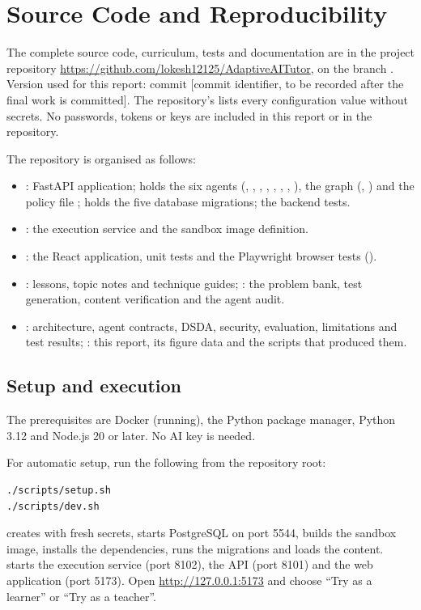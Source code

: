 \chapter{Source Code and Reproducibility}\label{app:repro}
The complete source code, curriculum, tests and documentation are in the project repository \url{https://github.com/lokesh12125/AdaptiveAITutor}, on the branch . Version used for this report: commit [commit identifier, to be recorded after the final work is committed]. The repository's  lists every configuration value without secrets. No passwords, tokens or keys are included in this report or in the repository.

The repository is organised as follows:
{\sloppy
\begin{itemize}
\item {}: FastAPI application;  holds the six agents (, , , , , , , ), the graph (, ) and the policy file ;  holds the five database migrations;  the backend tests.
\item {}: the execution service and the sandbox image definition.
\item {}: the React application, unit tests and the Playwright browser tests ().
\item {}: lessons, topic notes and technique guides; : the problem bank, test generation, content verification and the agent audit.
\item {}: architecture, agent contracts, DSDA, security, evaluation, limitations and test results; : this report, its figure data and the scripts that produced them.
\end{itemize}
}

\section{Setup and execution}
The prerequisites are Docker (running), the  Python package manager, Python 3.12 and Node.js 20 or later. No AI key is needed.

For automatic setup, run the following from the repository root:
{\small\begin{verbatim}
./scripts/setup.sh
./scripts/dev.sh
\end{verbatim}}
 creates  with fresh secrets, starts PostgreSQL on port 5544, builds the sandbox image, installs the dependencies, runs the migrations and loads the content.  starts the execution service (port 8102), the API (port 8101) and the web application (port 5173). Open \url{http://127.0.0.1:5173} and choose ``Try as a learner'' or ``Try as a teacher''.

